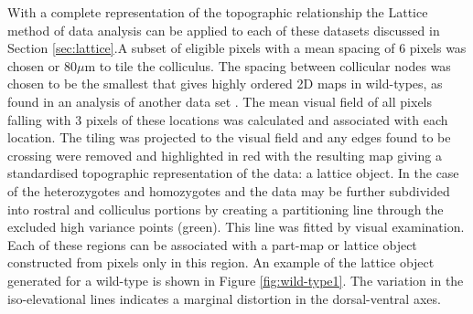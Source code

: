 With a complete representation of the topographic relationship the Lattice method of data analysis can be applied to each of these datasets discussed in Section \ref{sec:lattice}.A subset of eligible pixels with a mean spacing of 6 pixels was chosen or 80$\mu$m to tile the colliculus. The spacing between collicular nodes was chosen to be the smallest that gives highly ordered 2D maps in wild-types, as found in an analysis of another data set \cite{Willshaw2014-ms}. The mean visual field of all pixels falling with 3 pixels of these locations was calculated and associated with each location. The tiling was projected to the visual field and any edges found to be crossing were removed and highlighted in red with the resulting map giving a standardised topographic representation of the data: a lattice object. In the case of the heterozygotes and homozygotes and the data may be further subdivided into rostral and colliculus portions by creating a partitioning line through the excluded high variance points (green). This line was fitted by visual examination. Each of these regions can be associated with a part-map or lattice object constructed from pixels only in this region. An example of the lattice object generated for a wild-type is shown in Figure \ref{fig:wild-type1}. The variation in the iso-elevational lines indicates a marginal distortion in the dorsal-ventral axes.  

